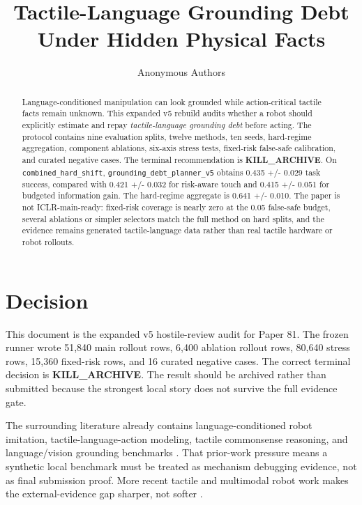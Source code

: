 \documentclass{article}
\title{Tactile-Language Grounding Debt Under Hidden Physical Facts}
\author{Anonymous Authors}
\begin{document}
\maketitle

\begin{abstract}
Language-conditioned manipulation can look grounded while action-critical tactile facts remain unknown. This expanded v5 rebuild audits whether a robot should explicitly estimate and repay \emph{tactile-language grounding debt} before acting. The protocol contains nine evaluation splits, twelve methods, ten seeds, hard-regime aggregation, component ablations, six-axis stress tests, fixed-risk false-safe calibration, and curated negative cases. The terminal recommendation is \textbf{KILL\_ARCHIVE}. On \texttt{combined\_hard\_shift}, \texttt{grounding\_debt\_planner\_v5} obtains 0.435 +/- 0.029 task success, compared with 0.421 +/- 0.032 for risk-aware touch and 0.415 +/- 0.051 for budgeted information gain. The hard-regime aggregate is 0.641 +/- 0.010. The paper is not ICLR-main-ready: fixed-risk coverage is nearly zero at the 0.05 false-safe budget, several ablations or simpler selectors match the full method on hard splits, and the evidence remains generated tactile-language data rather than real tactile hardware or robot rollouts.
\end{abstract}

\section{Decision}
This document is the expanded v5 hostile-review audit for Paper 81. The frozen runner wrote 51,840 main rollout rows, 6,400 ablation rollout rows, 80,640 stress rows, 15,360 fixed-risk rows, and 16 curated negative cases. The correct terminal decision is \textbf{KILL\_ARCHIVE}. The result should be archived rather than submitted because the strongest local story does not survive the full evidence gate.

The surrounding literature already contains language-conditioned robot imitation, tactile-language-action modeling, tactile commonsense reasoning, and language/vision grounding benchmarks \citep{prior1,prior2,prior3,prior4,prior5,prior6,prior7,prior8}. That prior-work pressure means a synthetic local benchmark must be treated as mechanism debugging evidence, not as final submission proof. More recent tactile and multimodal robot work makes the external-evidence gap sharper, not softer \citep{prior9,prior10,prior11,prior12,prior13,prior14,prior15,prior16}.
\end{document}
